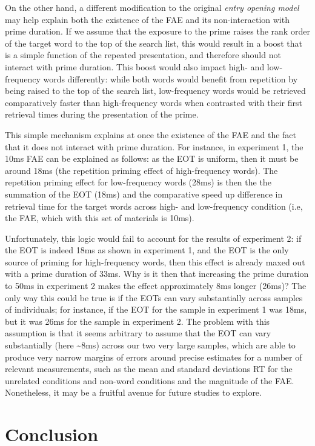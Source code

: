 \documentclass[
]{interact}
\begin{document}
On the other hand, a different modification to the original \emph{entry
opening model} may help explain both the existence of the FAE and its
non-interaction with prime duration. If we assume that the exposure to
the prime raises the rank order of the target word to the top of the
search list, this would result in a boost that is a simple function of
the repeated presentation, and therefore should not interact with prime
duration. This boost would also impact high- and low-frequency words
differently: while both words would benefit from repetition by being
raised to the top of the search list, low-frequency words would be
retrieved comparatively faster than high-frequency words when contrasted
with their first retrieval times during the presentation of the prime.

This simple mechanism explains at once the existence of the FAE and the
fact that it does not interact with prime duration. For instance, in
experiment 1, the 10ms FAE can be explained as follows: as the EOT is
uniform, then it must be around 18ms (the repetition priming effect of
high-frequency words). The repetition priming effect for low-frequency
words (28ms) is then the the summation of the EOT (18ms) and the
comparative speed up difference in retrieval time for the target words
across high- and low-frequency condition (i.e, the FAE, which with this
set of materials is 10ms).

Unfortunately, this logic would fail to account for the results of
experiment 2: if the EOT is indeed 18ms as shown in experiment 1, and
the EOT is the only source of priming for high-frequency words, then
this effect is already maxed out with a prime duration of 33ms. Why is
it then that increasing the prime duration to 50ms in experiment 2 makes
the effect approximately 8ms longer (26ms)? The only way this could be
true is if the EOTs can vary substantially across samples of
individuals; for instance, if the EOT for the sample in experiment 1 was
18ms, but it was 26ms for the sample in experiment 2. The problem with
this assumption is that it seems arbitrary to assume that the EOT can
vary substantially (here \textasciitilde8ms) across our two very large
samples, which are able to produce very narrow margins of errors around
precise estimates for a number of relevant measurements, such as the
mean and standard deviations RT for the unrelated conditions and
non-word conditions and the magnitude of the FAE. Nonetheless, it may be
a fruitful avenue for future studies to explore.

\section{Conclusion}\label{conclusion}
\end{document}
